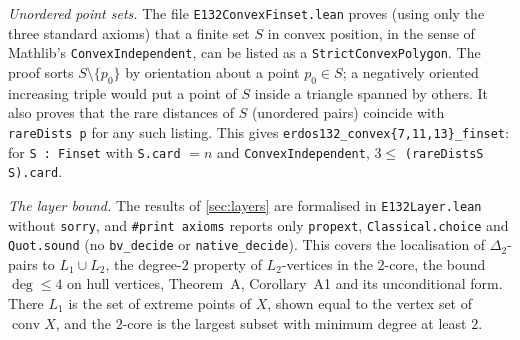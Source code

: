 \documentclass[11pt]{amsart}
\theoremstyle{definition}
\theoremstyle{remark}
\newcommand{\Dt}{\Delta_2}
\begin{document}
\emph{Unordered point sets.} The file \texttt{E132ConvexFinset.lean} proves (using only the three standard axioms) that a finite set $S$ in convex position, in the sense of Mathlib's \texttt{ConvexIndependent}, can be listed as a \texttt{StrictConvexPolygon}. The proof sorts $S\setminus\{p_0\}$ by orientation about a point $p_0\in S$; a negatively oriented increasing triple would put a point of $S$ inside a triangle spanned by others. It also proves that the rare distances of $S$ (unordered pairs) coincide with \texttt{rareDists p} for any such listing. This gives \texttt{erdos132\_convex\{7,11,13\}\_finset}: for \texttt{S : Finset} with \texttt{S.card} $=n$ and \texttt{ConvexIndependent}, $3\le$ \texttt{(rareDistsS S).card}.

\emph{The layer bound.} The results of \cref{sec:layers} are formalised in \texttt{E132Layer.lean} without \texttt{sorry}, and \texttt{\#print\allowbreak{} axioms} reports only \texttt{propext}, \texttt{Classical.choice} and \texttt{Quot.sound} (no \texttt{bv\_decide} or \texttt{native\_decide}). This covers the localisation of $\Dt$-pairs to $L_1\cup L_2$, the degree-$2$ property of $L_2$-vertices in the $2$-core, the bound $\deg\le4$ on hull vertices, Theorem~A, Corollary~A1 and its unconditional form. There $L_1$ is the set of extreme points of $X$, shown equal to the vertex set of $\operatorname{conv}X$, and the $2$-core is the largest subset with minimum degree at least $2$.
\end{document}

